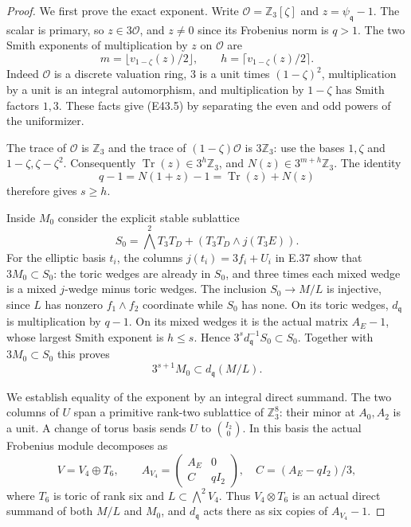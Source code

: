 \begin{proof}
We first prove the exact exponent. Write
$\mathcal O=\mathbb Z_3[\zeta]$ and
$z=\psi_{\mathfrak q}-1$. The scalar is primary,
so $z\in3\mathcal O$, and $z\ne0$ since its
Frobenius norm is $q>1$. The two Smith exponents of
multiplication by $z$ on $\mathcal O$ are
\[
 m=\lfloor v_{1-\zeta}(z)/2\rfloor,\qquad
 h=\lceil v_{1-\zeta}(z)/2\rceil.
 \tag{E43.5}
\]
Indeed $\mathcal O$ is a discrete valuation ring,
$3$ is a unit times $(1-\zeta)^2$, multiplication
by a unit is an integral automorphism, and
multiplication by $1-\zeta$ has Smith factors
$1,3$. These facts give (E43.5) by separating
the even and odd powers of the uniformizer.

The trace of $\mathcal O$ is $\mathbb Z_3$ and
the trace of $(1-\zeta)\mathcal O$ is $3\mathbb Z_3$:
use the bases $1,\zeta$ and $1-\zeta,\zeta-\zeta^2$.
Consequently $\operatorname{Tr}(z)\in3^h\mathbb Z_3$,
and $N(z)\in3^{m+h}\mathbb Z_3$. The identity
\[
 q-1=N(1+z)-1=\operatorname{Tr}(z)+N(z)
\]
therefore gives $s\ge h$.

Inside $M_0$ consider the explicit stable sublattice
\[
 S_0=\bigwedge^2T_3T_D+
                  (T_3T_D\wedge j(T_3E)).
 \tag{E43.6}
\]
For the elliptic basis $t_i$, the columns
$j(t_i)=3f_i+U_i$ in E.37 show that
$3M_0\subset S_0$: the toric wedges are already
in $S_0$, and three times each mixed wedge is a
mixed $j$-wedge minus toric wedges. The inclusion
$S_0\to M/L$ is injective, since $L$ has nonzero
$f_1\wedge f_2$ coordinate while $S_0$ has none.
On its toric wedges, $d_{\mathfrak q}$ is
multiplication by $q-1$. On its mixed wedges it
is the actual matrix $A_E-1$, whose largest
Smith exponent is $h\le s$. Hence
$3^s d_{\mathfrak q}^{-1}S_0\subset S_0$.
Together with $3M_0\subset S_0$ this proves
\[
             3^{s+1}M_0\subset d_{\mathfrak q}(M/L).
 \tag{E43.7}
\]

We establish equality of the exponent by an integral
direct summand. The two columns of $U$ span a primitive
rank-two sublattice of $\mathbb Z_3^8$: their minor
at $A_0,A_2$ is a unit. A change of torus basis sends
$U$ to $\binom{I_2}{0}$. In this basis the actual
Frobenius module decomposes as
\[
 V=V_4\oplus T_6,\qquad
 A_{V_4}=\begin{pmatrix}A_E&0\\C&qI_2\end{pmatrix},
 \quad C=(A_E-qI_2)/3,
 \tag{E43.8}
\]
where $T_6$ is toric of rank six and $L\subset
\bigwedge^2V_4$. Thus $V_4\otimes T_6$ is an
actual direct summand of both $M/L$ and $M_0$,
and $d_{\mathfrak q}$ acts there as six copies
of $A_{V_4}-1$.


\end{proof}
